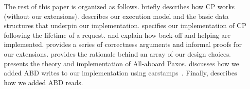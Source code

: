 The rest of this paper is organized as follows.
 briefly describes how CP works (without our extensions).
 describes our execution model and the basic data structures that underpin our implementation.
 specifies our implementation of CP following the lifetime of a request.  and  explain how back-off and helping are implemented.  provides a series of correctness arguments and informal proofs for our extensions.  provides the rationale behind an array of our design choices.  presents the theory and implementation of All-aboard Paxos.  discusses how we added ABD writes to our implementation using carstamps~\cite{Burke:2020}. Finally,  describes how we added ABD reads.















 






